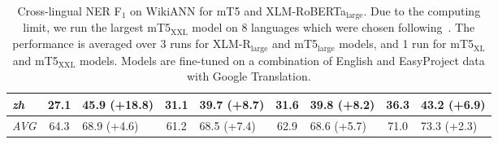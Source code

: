 \documentclass[11pt,dvipsnames]{article}
\begin{document}
\begin{table*}[ht!]
\begin{tabular}{lcccccccccccc}
\textit{zh}&27.1&\multicolumn{2}{l}{\cellcolor[HTML]{52BE80} 45.9 (+18.8)}&31.1&\multicolumn{2}{l}{\cellcolor[HTML]{7DCEA0} 39.7 (+8.7)}&31.6&\multicolumn{2}{l}{\cellcolor[HTML]{7DCEA0} 39.8 (+8.2)}&36.3&\multicolumn{2}{l}{\cellcolor[HTML]{7DCEA0} 43.2 (+6.9)}\\
\midrule
\textit{AVG}&64.3&\multicolumn{2}{l}{\cellcolor[HTML]{A9DFBF} 68.9 (+4.6)}&61.2&\multicolumn{2}{l}{\cellcolor[HTML]{7DCEA0} 68.5 (+7.4)}&62.9&\multicolumn{2}{l}{\cellcolor[HTML]{7DCEA0} 68.6 (+5.7)}&71.0&\multicolumn{2}{l}{\cellcolor[HTML]{A9DFBF} 73.3 (+2.3)}\\
\bottomrule
\end{tabular}
\vspace{-5pt}
\caption{Cross-lingual NER F$_1$ on WikiANN for mT5 and XLM-RoBERTa$_{\text{large}}$. Due to the computing limit, we run the largest mT5$_{\text{XXL}}$ model on 8 languages which were chosen following~\citet{wu-2021-everything}. The performance is averaged over 3 runs for XLM-R$_{\text{large}}$ and mT5$_{\text{large}}$ models, and  1 run for mT5$_{\text{XL}}$ and mT5$_{\text{XXL}}$ models. Models are fine-tuned on a combination of English and EasyProject data with Google Translation.}
\label{table:mt5_detail}
\end{table*}
 
\end{document}
